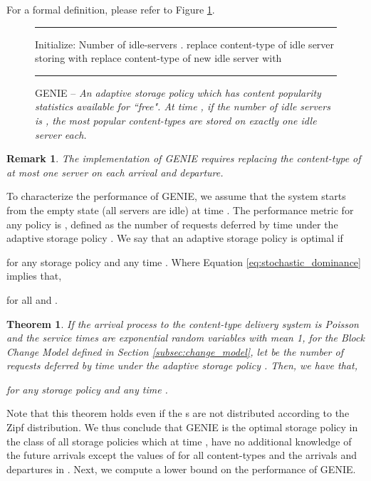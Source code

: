 \documentclass[10pt, conference, letterpaper]{IEEEtran}
\newtheorem{remark}{Remark}
\newtheorem{theorem}{Theorem}
\begin{document}
\noindent For a formal definition, please refer to Figure
\ref{policy:GENIE}. \\

\begin{figure}[h]
	\hrule
	\vspace{0.1in}
	\begin{algorithmic}[1]
		\STATE Initialize: Number of idle-servers .
		\IF {,}
		\STATE replace content-type of idle server storing  with 
		\ENDIF
		\STATE 
		\ENDIF
		\STATE replace content-type of new idle server with 
		\STATE 
		\ENDIF
		\ENDWHILE
	\end{algorithmic}
	\vspace{0.1in}
	\hrule
	\caption{GENIE -- \sl An adaptive storage policy which has content popularity statistics available for ``free". At time , if the number of idle servers is , the  most popular content-types are stored on exactly one idle server each.}
	\label{policy:GENIE}
\end{figure}
\begin{remark} The implementation of GENIE requires replacing the
	content-type of at most one server on each arrival and departure.
\end{remark}

To characterize the performance of GENIE, we assume that the system
starts from the empty state (all servers are idle) at time . The
performance metric for any policy  is
, defined as the number of requests deferred by
time  under the adaptive storage policy .  We say that
an adaptive storage policy  is optimal if

for any storage policy  and any time .
Where Equation \ref{eq:stochastic_dominance} implies that,

for all  and .

\begin{theorem}
	\label{thm:stochastic_dominance}
	If the arrival process to the content-type delivery system is Poisson
	and the service times are exponential random variables with mean 1,
	for the Block Change Model defined in Section
	\ref{subsec:change_model}, let  be the number of
	requests deferred by time  under the adaptive storage policy
	. Then, we have that,
	
	for any storage policy  and any time .
\end{theorem}

Note that this theorem holds even if the s are not
distributed according to the Zipf distribution. We thus conclude that
GENIE is the optimal storage policy in the class of all storage
policies which at time , have no additional knowledge of the future
arrivals except the values of  for all content-types and
the arrivals and departures in . Next, we compute a lower
bound on the performance of GENIE.
\end{document}
